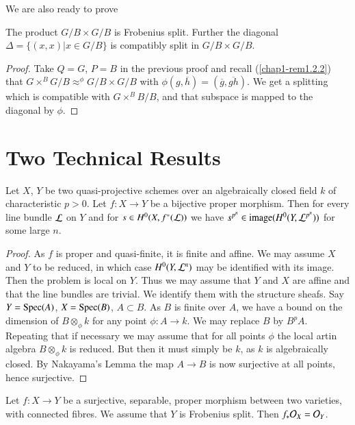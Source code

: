 We are also ready to prove 

\begin{proposition}\label{prop-A.4.9}
The\pageoriginale 
product\label{page88}  $G/B\times G/B$ is Frobenius split. Further the diagonal
$\Delta=\{(x,x)|x\in G/B\}$ is compatibly split in $G/B\times G/B$.
\end{proposition}

\begin{proof}
Take $Q=G$, $P=B$ in the previous proof and recall
(\ref{chap1-rem1.2.2}) that
$G\times^{B}G/B{\displaystyle{\mathop{\approx}^{\phi}}}G/B\times G/B$
with $\phi(g,\overline{h})=(\overline{g},\overline{gh})$. We get a
splitting which is compatible with $G\times^{B}B/B$, and that subspace
is mapped to the diagonal by $\phi$.
\end{proof}

\section{Two Technical Results}\label{sec-A.5}

\begin{sublemma}\label{sublem-A.5.1}
Let $X$, $Y$ be two quasi-projective schemes over an algebraically
closed field $k$ of characteristic $p>0$. Let $f:X\to Y$ be a
bijective proper morphism. Then for every line bundle $\mathcal{L}$ on $Y$ and
for $s\in H^{0}(X,f^{*}(\mathcal{L}))$ we have $s^{p^{n}}\in \text{\rm
  image}(H^{0}(Y,\mathcal{L}^{p^{n}}))$ for some large $n$.
\end{sublemma}

\begin{proof}
As $f$ is proper and quasi-finite, it is finite and affine. We may
assume $X$ and $Y$ to be reduced, in which case $H^{0}(Y,\mathcal{L}^{n})$ may
be identified with its image. Then the problem is local on $Y$. Thus
we may assume that $Y$ and $X$ are affine and that the line bundles
are trivial. We identify them with the structure sheafs. Say $Y=\operatorname{Spec}
(A)$, $X=\operatorname{Spec}(B)$, $A\subset B$. As $B$ is finite over $A$, we have a
bound on the dimension of $B\otimes_{\phi}k$ for any point $\phi:A\to
k$. We may replace $B$ by $B^{p}A$. Repeating that if necessary we may
assume that for all points $\phi$ the local artin algebra
$B\otimes_{\phi}k$ is reduced. But then it must simply be $k$, as $k$
is algebraically closed. By Nakayama's Lemma the map $A\to B$ is now
surjective at all points, hence surjective.
\end{proof}

\begin{proposition}\label{prop-A.5.2}
Let $f:X\to Y$ be a surjective, separable, proper morphism between two
varieties, with connected fibres. We assume that $Y$ is Frobenius
split. Then $f_{\ast}\mathcal{O}_{X}=\mathcal{O}_{Y}$.
\end{proposition}

